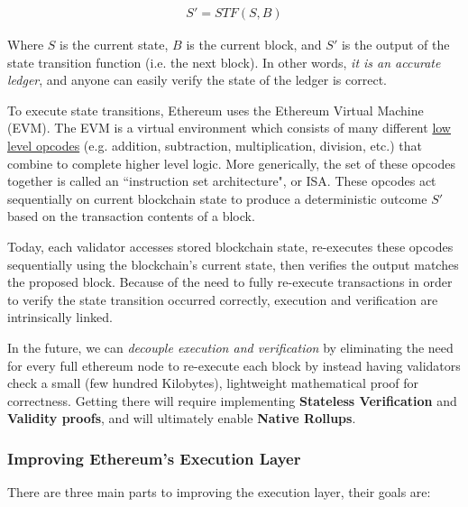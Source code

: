 \documentclass[12pt]{article}
\begin{document}
\begin{align}
    S' = STF(S, B)
\end{align}

Where $S$ is the current state, $B$ is the current block, and $S'$ is the output of the state transition function (i.e. the next block). In other words, \textit{it is an accurate ledger}, and anyone can easily verify the state of the ledger is correct. 

To execute state transitions, Ethereum uses the Ethereum Virtual Machine (EVM). The EVM is a virtual environment which consists of many different \href{https://www.ethervm.io/}{low level opcodes} (e.g. addition, subtraction, multiplication, division, etc.) that combine to complete higher level logic. More generically, the set of these opcodes together is called an ``instruction set architecture", or ISA. These opcodes act sequentially on current blockchain state to produce a deterministic outcome $S'$ based on the transaction contents of a block. 

Today, each validator accesses stored blockchain state, re-executes these opcodes sequentially using the blockchain's current state, then verifies the output matches the proposed block. Because of the need to fully re-execute transactions in order to verify the state transition occurred correctly, execution and verification are intrinsically linked. 

In the future, we can \textit{decouple execution and verification} by eliminating the need for every full ethereum node to re-execute each block by instead having validators check a small (few hundred Kilobytes), lightweight mathematical proof for correctness. Getting there will require implementing \textbf{Stateless Verification} and \textbf{Validity proofs}, and will ultimately enable \textbf{Native Rollups}.

\subsubsection{Improving Ethereum's Execution Layer}

There are three main parts to improving the execution layer, their goals are:
\end{document}
